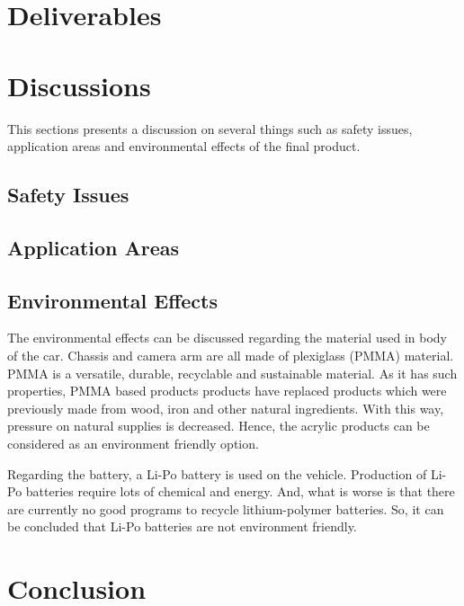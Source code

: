 \documentclass[a4paper,12pt]{article}
\begin{document}

	\section{Deliverables}

	\section{Discussions}
		This sections presents a discussion on several things such as safety issues, application areas and environmental effects of the final product.
	
	\subsection{Safety Issues}

	\subsection{Application Areas}

	\subsection{Environmental Effects}
	
	The environmental effects can be discussed regarding the material used in body of the car. Chassis and camera arm are all made of plexiglass (PMMA) material. PMMA is a versatile, durable, recyclable and sustainable material. As it has such properties, PMMA based products products have replaced products which were previously made from wood, iron and other natural ingredients. With this way, pressure on natural supplies is decreased. Hence, the acrylic products can be considered as an environment friendly option.

	Regarding the battery, a Li-Po battery is used on the vehicle. Production of Li-Po batteries require lots of chemical and energy. And, what is worse is that there are currently no good programs to recycle lithium-polymer batteries. So, it can be concluded that Li-Po batteries are not environment friendly.


	\section{Conclusion}
\end{document}
